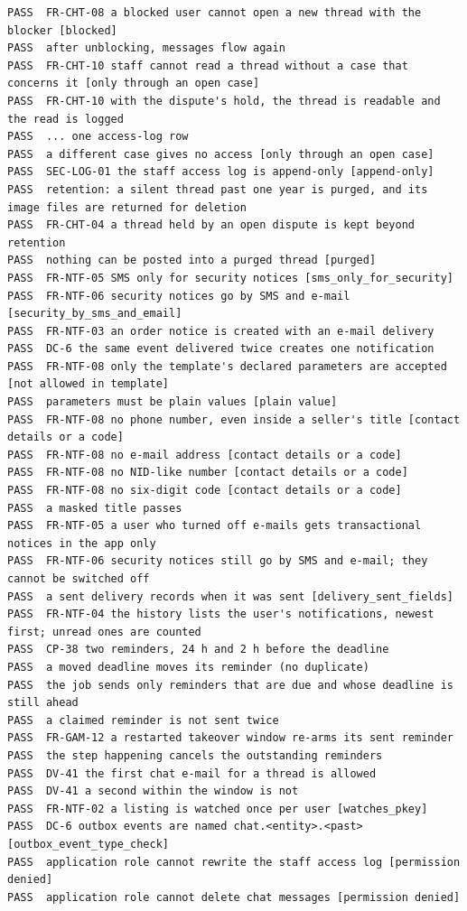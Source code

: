 \documentclass[11pt,a4paper]{article}
\begin{document}
{\begin{verbatim}
PASS  FR-CHT-08 a blocked user cannot open a new thread with the blocker [blocked]
PASS  after unblocking, messages flow again
PASS  FR-CHT-10 staff cannot read a thread without a case that concerns it [only through an open case]
PASS  FR-CHT-10 with the dispute's hold, the thread is readable and the read is logged
PASS  ... one access-log row
PASS  a different case gives no access [only through an open case]
PASS  SEC-LOG-01 the staff access log is append-only [append-only]
PASS  retention: a silent thread past one year is purged, and its image files are returned for deletion
PASS  FR-CHT-04 a thread held by an open dispute is kept beyond retention
PASS  nothing can be posted into a purged thread [purged]
PASS  FR-NTF-05 SMS only for security notices [sms_only_for_security]
PASS  FR-NTF-06 security notices go by SMS and e-mail [security_by_sms_and_email]
PASS  FR-NTF-03 an order notice is created with an e-mail delivery
PASS  DC-6 the same event delivered twice creates one notification
PASS  FR-NTF-08 only the template's declared parameters are accepted [not allowed in template]
PASS  parameters must be plain values [plain value]
PASS  FR-NTF-08 no phone number, even inside a seller's title [contact details or a code]
PASS  FR-NTF-08 no e-mail address [contact details or a code]
PASS  FR-NTF-08 no NID-like number [contact details or a code]
PASS  FR-NTF-08 no six-digit code [contact details or a code]
PASS  a masked title passes
PASS  FR-NTF-05 a user who turned off e-mails gets transactional notices in the app only
PASS  FR-NTF-06 security notices still go by SMS and e-mail; they cannot be switched off
PASS  a sent delivery records when it was sent [delivery_sent_fields]
PASS  FR-NTF-04 the history lists the user's notifications, newest first; unread ones are counted
PASS  CP-38 two reminders, 24 h and 2 h before the deadline
PASS  a moved deadline moves its reminder (no duplicate)
PASS  the job sends only reminders that are due and whose deadline is still ahead
PASS  a claimed reminder is not sent twice
PASS  FR-GAM-12 a restarted takeover window re-arms its sent reminder
PASS  the step happening cancels the outstanding reminders
PASS  DV-41 the first chat e-mail for a thread is allowed
PASS  DV-41 a second within the window is not
PASS  FR-NTF-02 a listing is watched once per user [watches_pkey]
PASS  DC-6 outbox events are named chat.<entity>.<past> [outbox_event_type_check]
PASS  application role cannot rewrite the staff access log [permission denied]
PASS  application role cannot delete chat messages [permission denied]


\end{verbatim}}
\end{document}
